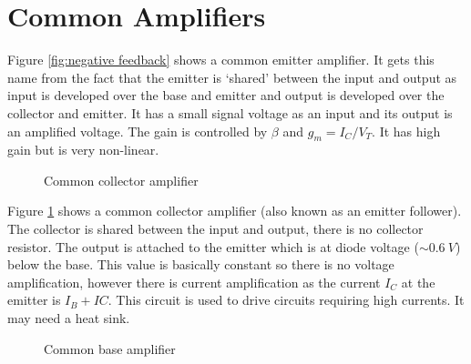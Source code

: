 \documentclass{article}
\begin{document}
    \section{Common Amplifiers}
    Figure \ref{fig:negative feedback} shows a common emitter amplifier.
    It gets this name from the fact that the emitter is `shared' between the input and output as input is developed over the base and emitter and output is developed over the collector and emitter.
    It has a small signal voltage as an input and its output is an amplified voltage.
    The gain is controlled by \(\beta\) and \(g_m = I_C/V_T\).
    It has high gain but is very non-linear.
    
    \begin{figure}[ht]
        \centering
        \caption{Common collector amplifier}
        \label{fig:common collector amplifier}
    \end{figure}

    Figure \ref{fig:common collector amplifier} shows a common collector amplifier (also known as an emitter follower).
    The collector is shared between the input and output, there is no collector resistor.
    The output is attached to the emitter which is at diode voltage (\(\sim\SI{0.6}{V}\)) below the base.
    This value is basically constant so there is no voltage amplification, however there is current amplification as the current \(I_C\) at the emitter is \(I_B + IC\).
    This circuit is used to drive circuits requiring high currents.
    It may need a heat sink.
    
    \begin{figure}[ht]
        \centering
        \caption{Common base amplifier}
        \label{fig:common base amplifier}
    \end{figure}
\end{document}
